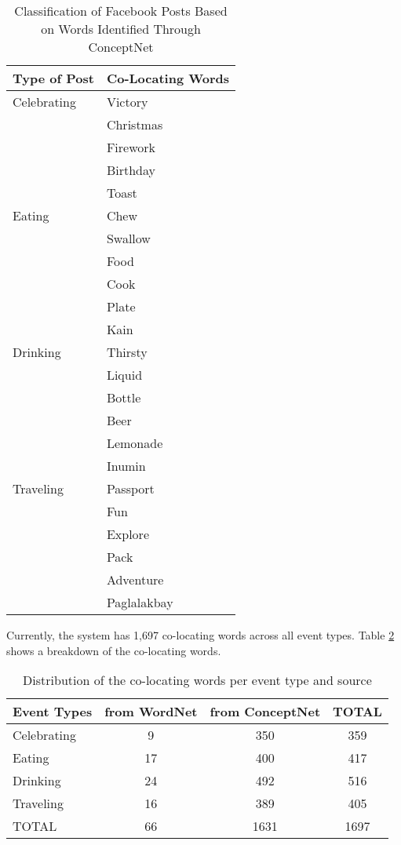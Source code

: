 \begin{table}[ph!]   %
	\centering
	\caption{Classification of Facebook Posts Based on Words Identified Through ConceptNet} \vspace{0.25em}
	\begin{tabular}{|p{1.5in}|p{2in}|} \hline
		\centering Type of Post & Co-Locating Words \\ \hline
		Celebrating 
			& Victory \\ 
			& Christmas \\ 
			& Firework \\ 
			& Birthday \\ 
			& Toast \\\hline
		Eating  
			& Chew \\ 
			& Swallow \\ 
			& Food \\ 
			& Cook \\ 
			& Plate \\ 
			& Kain \\\hline

		Drinking 
			& Thirsty \\ 
			& Liquid \\
			& Bottle \\ 
			& Beer \\ 
			& Lemonade \\ 
			& Inumin \\\hline
		Traveling 
			& Passport \\ 
			& Fun \\ 
			& Explore \\ 
			& Pack \\ 
			& Adventure \\ 
			& Paglalakbay  \\\hline
	\end{tabular}
	\label{tab:EventClassificationConceptNet}
\end{table}

Currently, the system has 1,697 co-locating words across all event types. Table \ref{tab:Co-locatingWords} shows a breakdown of the co-locating words.
\begin{table}[ph!]   %
	\centering
	\caption{Distribution of the co-locating words per event type and source} \vspace{0.25em}
	\begin{tabular}{|p{1in}|c|c|c|} \hline
		\centering Event Types & from WordNet & from ConceptNet & TOTAL \\ \hline
		Celebrating & 9 & 350 & 359 \\ \hline
		Eating & 17 & 400 & 417 \\ \hline
		Drinking & 24 & 492 & 516 \\ \hline
		Traveling & 16 & 389 & 405 \\ \hline
		TOTAL & 66 & 1631 & 1697 \\ \hline
	\end{tabular}
	\label{tab:Co-locatingWords}
\end{table}

